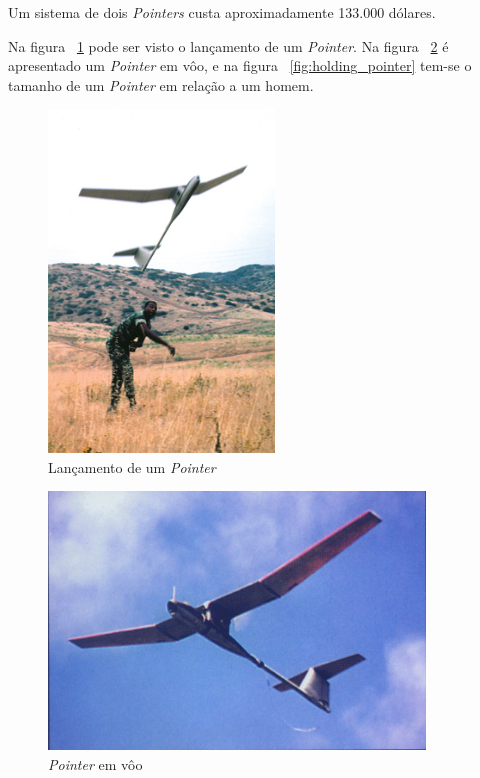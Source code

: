 Um sistema de dois \emph{Pointers} custa aproximadamente 133.000 dólares. \cite{RL31872}

Na figura ~\ref{fig:launching_pointer} pode ser visto o lançamento de um \emph{Pointer}. Na figura ~\ref{fig:pointer} é apresentado um \emph{Pointer} em vôo, e na figura ~\ref{fig:holding_pointer} tem-se o tamanho de um \emph{Pointer} em relação a um homem.

\begin{figure}[h!]
\centering
\includegraphics[width=6cm]{pictures/launching_pointer.jpg}
\caption{Lançamento de um \emph{Pointer} }
 \label{fig:launching_pointer}
\end{figure}

\begin{figure}[h!]
\centering
\includegraphics[width=10cm]{pictures/pointer_coloer.jpg}
\caption{ \emph{Pointer} em vôo}
 \label{fig:pointer}
\end{figure}

